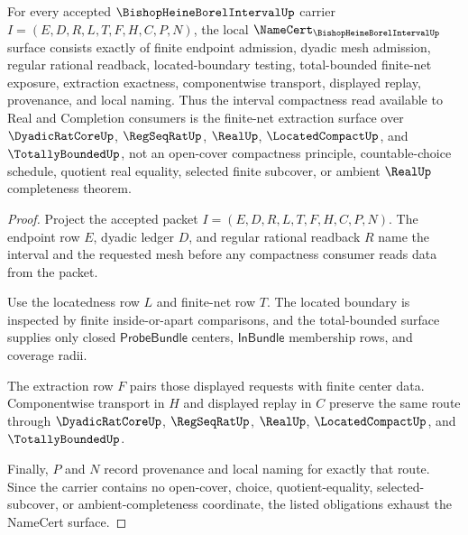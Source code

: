 \begin{theorem}
\label{thm:located-compactness-net-extraction-namecert-obligations}
For every accepted $\BishopHeineBorelIntervalUp$ carrier $I=(E,D,R,L,T,F,H,C,P,N)$, the local $\NameCert_{\BishopHeineBorelIntervalUp}$ surface consists exactly of finite endpoint admission, dyadic mesh admission, regular rational readback, located-boundary testing, total-bounded finite-net exposure, extraction exactness, componentwise transport, displayed replay, provenance, and local naming. Thus the interval compactness read available to Real and Completion consumers is the finite-net extraction surface over $\DyadicRatCoreUp$, $\RegSeqRatUp$, $\RealUp$, $\LocatedCompactUp$, and $\TotallyBoundedUp$, not an open-cover compactness principle, countable-choice schedule, quotient real equality, selected finite subcover, or ambient $\RealUp$ completeness theorem.
\end{theorem}
\begin{proof}
Project the accepted packet $I=(E,D,R,L,T,F,H,C,P,N)$. The endpoint row $E$, dyadic ledger $D$, and regular rational readback $R$ name the interval and the requested mesh before any compactness consumer reads data from the packet.

Use the locatedness row $L$ and finite-net row $T$. The located boundary is inspected by finite inside-or-apart comparisons, and the total-bounded surface supplies only closed $\mathsf{ProbeBundle}$ centers, $\mathsf{InBundle}$ membership rows, and coverage radii.

The extraction row $F$ pairs those displayed requests with finite center data. Componentwise transport in $H$ and displayed replay in $C$ preserve the same route through $\DyadicRatCoreUp$, $\RegSeqRatUp$, $\RealUp$, $\LocatedCompactUp$, and $\TotallyBoundedUp$.

Finally, $P$ and $N$ record provenance and local naming for exactly that route. Since the carrier contains no open-cover, choice, quotient-equality, selected-subcover, or ambient-completeness coordinate, the listed obligations exhaust the NameCert surface.
\end{proof}

